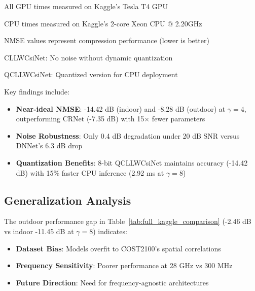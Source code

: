 \documentclass[lettersize,journal]{IEEEtran}
\begin{document}
\begin{table}[t]
\begin{threeparttable}
		\begin{tablenotes}
			\footnotesize
			\item[1] All GPU times measured on Kaggle's Tesla T4 GPU
			\item[2] CPU times measured on Kaggle's 2-core Xeon CPU @ 2.20GHz
			\item[3] NMSE values represent compression performance (lower is better)
			\item[4] CLLWCsiNet: No noise without dynamic quantization
			\item[5] QCLLWCsiNet: Quantized version for CPU deployment
		\end{tablenotes}
	\end{threeparttable}
\end{table}
Key findings include:
\begin{itemize}
	\item \textbf{Near-ideal NMSE}: -14.42 dB (indoor) and -8.28 dB (outdoor) at $\gamma=4$, outperforming CRNet (-7.35 dB) with 15$\times$ fewer parameters
	\item \textbf{Noise Robustness}: Only 0.4 dB degradation under 20 dB SNR versus DNNet's 6.3 dB drop
	\item \textbf{Quantization Benefits}: 8-bit QCLLWCsiNet maintains accuracy (-14.42 dB) with 15\% faster CPU inference (2.92 ms at $\gamma=8$)
\end{itemize}


\subsection{Generalization Analysis}
The outdoor performance gap in Table~\ref{tab:full_kaggle_comparison} (-2.46 dB vs indoor -11.45 dB at $\gamma=8$) indicates:
\begin{itemize}
	\item \textbf{Dataset Bias}: Models overfit to COST2100's spatial correlations
	\item \textbf{Frequency Sensitivity}: Poorer performance at 28 GHz vs 300 MHz
	\item \textbf{Future Direction}: Need for frequency-agnostic architectures
\end{itemize}
\end{document}
